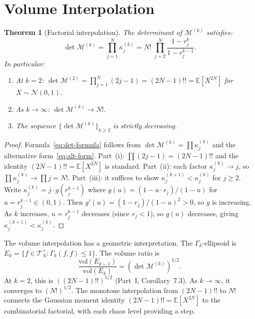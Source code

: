 \documentclass[11pt,a4paper]{article}
\theoremstyle{plain}
\newtheorem{theorem}{Theorem}[section]
\theoremstyle{definition}
\theoremstyle{remark}
\newcommand{\E}{\mathbb{E}}
\begin{document}
\section{Volume Interpolation}\label{sec:volume}

\begin{theorem}[Factorial interpolation]\label{thm:volume}
The determinant of $\mathcal{M}^{(k)}$ satisfies:
\begin{equation}\label{eq:det-formula}
  \det \mathcal{M}^{(k)}
  = \prod_{j=1}^N \kappa_j^{(k)}
  = N!\;\prod_{j=2}^N \frac{1 - r_j^k}{1 - r_j^{k-1}}.
\end{equation}
In particular:
\begin{enumerate}[label=(\roman*)]
\item At $k = 2$:
  $\det \mathcal{M}^{(2)} = \prod_{j=1}^N (2j-1) = (2N-1)!!
  = \E[X^{2N}]$ for $X \sim \mathcal{N}(0,1)$.
\item As $k \to \infty$:
  $\det \mathcal{M}^{(k)} \to N!$.
\item The sequence $\{\det \mathcal{M}^{(k)}\}_{k \geq 2}$
  is strictly decreasing.
\end{enumerate}
\end{theorem}

\begin{proof}
Formula~\eqref{eq:det-formula} follows from
$\det \mathcal{M}^{(k)} = \prod \kappa_j^{(k)}$
and the alternative form~\eqref{eq:alt-form}.
Part~(i): $\prod(2j-1) = (2N-1)!!$ and the identity
$(2N-1)!! = \E[X^{2N}]$ is standard.
Part~(ii): each factor $\kappa_j^{(k)} \to j$, so
$\prod \kappa_j^{(k)} \to \prod j = N!$.
Part~(iii): it suffices to show $\kappa_j^{(k+1)} < \kappa_j^{(k)}$
for $j \geq 2$.
Write $\kappa_j^{(k)} = j \cdot g(r_j^{k-1})$ where
$g(u) = (1-u \cdot r_j)/(1-u)$ for $u = r_j^{k-1} \in (0,1)$.
Then $g'(u) = (1-r_j)/(1-u)^2 > 0$,
so $g$ is increasing.
As $k$ increases, $u = r_j^{k-1}$ decreases (since $r_j < 1$),
so $g(u)$ decreases, giving $\kappa_j^{(k+1)} < \kappa_j^{(k)}$.
\end{proof}

The volume interpolation has a geometric interpretation.
The $\Gamma_k$-ellipsoid is
$E_k = \{f \in \mathcal{T}_N^+ : \Gamma_k(f,f) \leq 1\}$.
The volume ratio is
\[
  \frac{\mathrm{vol}(E_{k-1})}{\mathrm{vol}(E_k)}
  = (\det \mathcal{M}^{(k)})^{1/2}.
\]
At $k = 2$, this is $((2N-1)!!)^{1/2}$ (Part~I, Corollary~7.3).
As $k \to \infty$, it converges to $(N!)^{1/2}$.
The monotone interpolation from $(2N-1)!!$ to $N!$
connects the Gaussian moment identity
$(2N-1)!! = \E[X^{2N}]$ to the combinatorial factorial,
with each chaos level providing a step.
\end{document}
